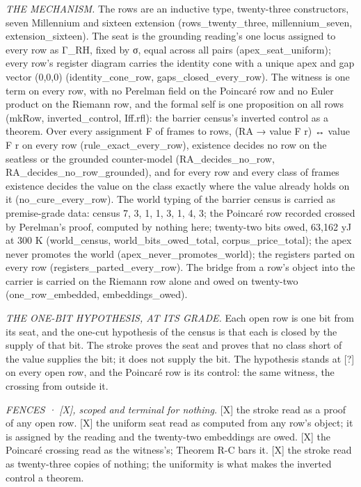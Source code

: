 \documentclass[10pt,twocolumn]{article}
\begin{document}
\emph{THE MECHANISM.} The rows are an inductive type, twenty-three
constructors, seven Millennium and sixteen extension
(rows\_twenty\_three, millennium\_seven, extension\_sixteen). The seat
is the grounding reading's one locus assigned to every row as Γ\_RH,
fixed by σ, equal across all pairs (apex\_seat\_uniform); every row's
register diagram carries the identity cone with a unique apex and gap
vector (0,0,0) (identity\_cone\_row, gaps\_closed\_every\_row). The
witness is one term on every row, with no Perelman field on the Poincaré
row and no Euler product on the Riemann row, and the formal self is one
proposition on all rows (mkRow, inverted\_control, Iff.rfl): the barrier
census's inverted control as a theorem. Over every assignment F of
frames to rows, (RA → value F r) ↔ value F r on every row
(rule\_exact\_every\_row), existence decides no row on the seatless or
the grounded counter-model (RA\_decides\_no\_row,
RA\_decides\_no\_row\_grounded), and for every row and every class of
frames existence decides the value on the class exactly where the value
already holds on it (no\_cure\_every\_row). The world typing of the
barrier census is carried as premise-grade data: census 7, 3, 1, 1, 3,
1, 4, 3; the Poincaré row recorded crossed by Perelman's proof, computed
by nothing here; twenty-two bits owed, 63,162 yJ at 300 K
(world\_census, world\_bits\_owed\_total, corpus\_price\_total); the
apex never promotes the world (apex\_never\_promotes\_world); the
registers parted on every row (registers\_parted\_every\_row). The
bridge from a row's object into the carrier is carried on the Riemann
row alone and owed on twenty-two (one\_row\_embedded, embeddings\_owed).

\emph{THE ONE-BIT HYPOTHESIS, AT ITS GRADE.} Each open row is one bit
from its seat, and the one-cut hypothesis of the census is that each is
closed by the supply of that bit. The stroke proves the seat and proves
that no class short of the value supplies the bit; it does not supply
the bit. The hypothesis stands at {[}?{]} on every open row, and the
Poincaré row is its control: the same witness, the crossing from outside
it.

\emph{FENCES · {[}X{]}, scoped and terminal for nothing.} {[}X{]} the
stroke read as a proof of any open row. {[}X{]} the uniform seat read as
computed from any row's object; it is assigned by the reading and the
twenty-two embeddings are owed. {[}X{]} the Poincaré crossing read as
the witness's; Theorem R-C bars it. {[}X{]} the stroke read as
twenty-three copies of nothing; the uniformity is what makes the
inverted control a theorem.
\end{document}
